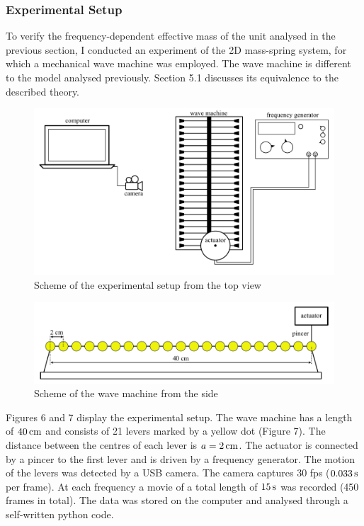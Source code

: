 \documentclass[12pt]{article}
\begin{document}
\subsubsection{Experimental Setup}  \label{sec:section3}
To verify the frequency-dependent effective mass of the unit analysed in the previous section, I conducted an experiment of the 2D mass-spring system, for which a mechanical wave machine was employed. The wave machine is different to the model analysed previously.
	Section 5.1 discusses its equivalence to the described theory.
\begin{figure}[hbt]
  \includegraphics[width=.8\columnwidth]{experimental_setup_sketch}
  \caption{Scheme of the experimental setup from the top view}
\end{figure}
\begin{figure}[hbt]
  \includegraphics[width=.8\columnwidth]{experimental_setup_sketch_side}
  \caption{Scheme of the wave machine from the side}
\end{figure}

Figures 6 and 7 display the experimental setup. The wave machine has a length of $40\, {\rm cm}$ and consists of 21 levers marked by a yellow dot (Figure 7). The distance between the centres of each lever is $a=2\, {\rm cm}$. The actuator is connected by a pincer to the first lever and is driven by a frequency generator. The motion of the levers was detected by a USB camera. The camera captures 30 fps ($0.033 \, {\rm s}$ per frame). At each frequency a movie of a total length of $15\,{\rm s}$ was recorded (450 frames in total). The data was stored on the computer and analysed through a self-written python code. 
\end{document}
